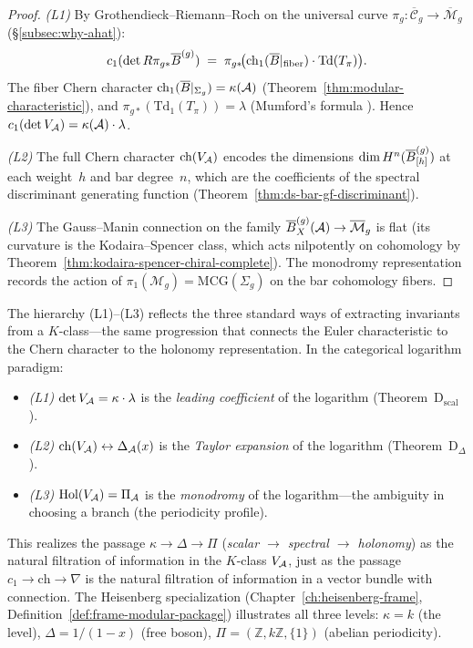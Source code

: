 \begin{proof}
\emph{(L1)}\enspace
By Grothendieck--Riemann--Roch on the universal curve
$\pi_g\colon \overline{\mathcal{C}}_g \to \overline{\mathcal{M}}_g$
(\S\ref{subsec:why-ahat}):
\[
c_1(\det R\pi_{g*} \overline{B}^{(g)})
\;=\;
\pi_{g*}\!\bigl(\mathrm{ch}_1(\overline{B}|_{\mathrm{fiber}})
\cdot \mathrm{Td}(T_\pi)\bigr).
\]
The fiber Chern character $\mathrm{ch}_1(\overline{B}|_{\Sigma_g})
= \kappa(\mathcal{A})$ (Theorem~\ref{thm:modular-characteristic}),
and $\pi_{g*}(\mathrm{Td}_1(T_\pi)) = \lambda$
(Mumford's formula \cite{Mumford83}).
Hence $c_1(\det V_{\mathcal{A}}) = \kappa(\mathcal{A}) \cdot \lambda$.

\emph{(L2)}\enspace
The full Chern character $\mathrm{ch}(V_{\mathcal{A}})$
encodes the dimensions $\dim H^n(\overline{B}^{(g)}_{[h]})$ at each
weight~$h$ and bar degree~$n$, which are the coefficients of the
spectral discriminant generating function
(Theorem~\ref{thm:ds-bar-gf-discriminant}).

\emph{(L3)}\enspace
The Gauss--Manin connection on the family
$\overline{B}^{(g)}_X(\mathcal{A}) \to \overline{\mathcal{M}}_g$ is flat
(its curvature is the Kodaira--Spencer class, which acts
nilpotently on cohomology by
Theorem~\ref{thm:kodaira-spencer-chiral-complete}).
The monodromy representation records the action of
$\pi_1(\mathcal{M}_g) = \mathrm{MCG}(\Sigma_g)$ on the bar
cohomology fibers.
\end{proof}

\begin{remark}
\label{rem:three-readings-V}
The hierarchy (L1)--(L3) reflects the three standard ways of
extracting invariants from a $K$-class---the same progression that
connects the Euler characteristic to the Chern character to the
holonomy representation.  In the categorical logarithm paradigm:
\begin{itemize}
\item \emph{(L1)} $\det V_{\mathcal{A}} = \kappa \cdot \lambda$
  is the \emph{leading coefficient} of the logarithm
  (Theorem~D$_{\mathrm{scal}}$).
\item \emph{(L2)} $\mathrm{ch}(V_{\mathcal{A}}) \leftrightarrow \Delta_{\mathcal{A}}(x)$
  is the \emph{Taylor expansion} of the logarithm
  (Theorem~D$_\Delta$).
\item \emph{(L3)} $\mathrm{Hol}(V_{\mathcal{A}}) = \Pi_{\mathcal{A}}$
  is the \emph{monodromy} of the logarithm---the ambiguity in
  choosing a branch (the periodicity profile).
\end{itemize}
This realizes the passage
$\kappa \to \Delta \to \Pi$
(\emph{scalar $\to$ spectral $\to$ holonomy}) as the natural
filtration of information in the $K$-class $V_{\mathcal{A}}$, just as the
passage $c_1 \to \mathrm{ch} \to \nabla$ is the natural filtration
of information in a vector bundle with connection.  The Heisenberg
specialization
(Chapter~\ref{ch:heisenberg-frame},
 Definition~\ref{def:frame-modular-package})
illustrates all three levels: $\kappa = k$ (the level),
$\Delta = 1/(1-x)$ (free boson),
$\Pi = (\mathbb{Z}, k\mathbb{Z}, \{1\})$ (abelian periodicity).
\end{remark}

